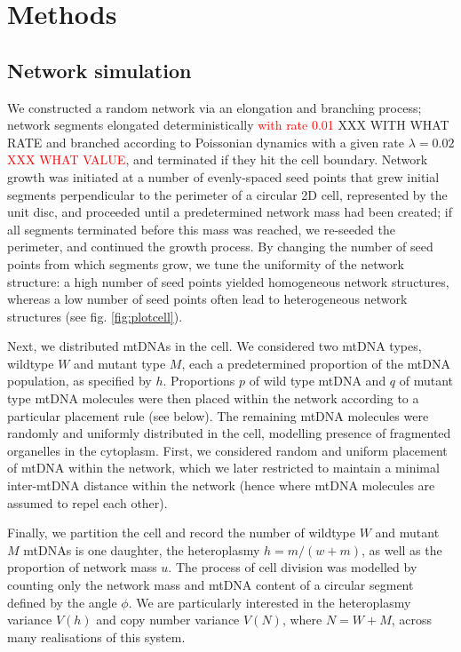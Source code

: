 \documentclass{article}
\begin{document}
\section{Methods}
\subsection*{Network simulation}

We constructed a random network via an elongation and branching process; network segments elongated deterministically \textcolor{red}{with rate 0.01} XXX WITH WHAT RATE and branched according to Poissonian dynamics with a given rate $\lambda=0.02$ \textcolor{red}{XXX WHAT VALUE}, and terminated if they hit the cell boundary. Network growth was initiated at a number of evenly-spaced seed points that grew initial segments perpendicular to the perimeter of a circular 2D cell, represented by the unit disc, and proceeded until a predetermined network mass had been created; if all segments terminated before this mass was reached, we re-seeded the perimeter, and continued the growth process. By changing the number of seed points from which segments grow, we tune the uniformity of the network structure: a high number of seed points yielded homogeneous network structures, whereas a low number of seed points often lead to heterogeneous network structures (see fig. \ref{fig:plotcell}).

Next, we distributed mtDNAs in the cell. We considered two mtDNA types, wildtype $W$ and mutant type $M$, each a predetermined proportion of the mtDNA population, as specified by $h$. Proportions $p$ of wild type mtDNA and $q$ of mutant type mtDNA molecules were then placed within the network according to a particular placement rule (see below). The remaining mtDNA molecules were randomly and uniformly distributed in the cell, modelling presence of fragmented organelles in the cytoplasm. First, we considered random and uniform placement of mtDNA within the network, which we later restricted to maintain a minimal inter-mtDNA distance within the network (hence where mtDNA molecules are assumed to repel each other).

Finally, we partition the cell and record the number of wildtype $W$ and mutant $M$ mtDNAs is one daughter, the heteroplasmy $h = m/(w+m)$, as well as the proportion of network mass $u$. The process of cell division was modelled by counting only the network mass and mtDNA content of a circular segment defined by the angle $\phi$.  We are particularly interested in the heteroplasmy variance $V(h)$ and copy number variance $V(N)$, where $N=W+M$, across many realisations of this system.  
\end{document}
